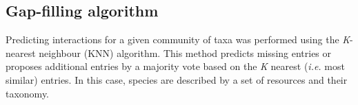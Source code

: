 \documentclass[letterpaper]{article}
\begin{document}
  \subsection{Gap-filling algorithm} %


Predicting interactions for a given community of taxa was performed using the \textit{K}-nearest neighbour (KNN) algorithm. This method predicts missing entries or proposes additional entries by a majority vote based on the \textit{K} nearest (\textit{i.e.} most similar) entries. In this case, species are described by a set of resources and their taxonomy.
\end{document}
